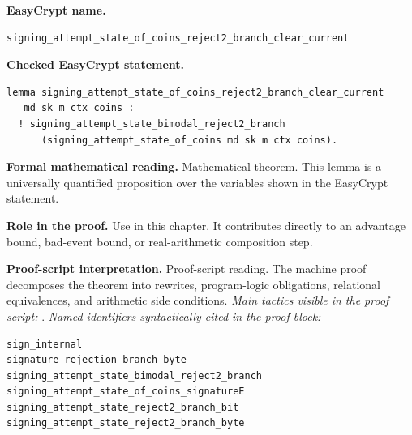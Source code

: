 \begin{formaltheorem}
\noindent\textbf{EasyCrypt name.}
\begin{lstlisting}[language=EasyCrypt,basicstyle=\ttfamily\scriptsize]
signing_attempt_state_of_coins_reject2_branch_clear_current
\end{lstlisting}
\noindent\textbf{Checked EasyCrypt statement.}
\begin{lstlisting}[language=EasyCrypt,basicstyle=\ttfamily\scriptsize]
lemma signing_attempt_state_of_coins_reject2_branch_clear_current
   md sk m ctx coins :
  ! signing_attempt_state_bimodal_reject2_branch
      (signing_attempt_state_of_coins md sk m ctx coins).
\end{lstlisting}
\noindent\textbf{Formal mathematical reading.}
Mathematical theorem. This lemma is a universally quantified proposition over the variables shown in the EasyCrypt statement.

\noindent\textbf{Role in the proof.}
Use in this chapter. It contributes directly to an advantage bound, bad-event bound, or real-arithmetic composition step.

\noindent\textbf{Proof-script interpretation.}
Proof-script reading. The machine proof decomposes the theorem into rewrites, program-logic obligations, relational equivalences, and arithmetic side conditions.
\emph{Main tactics visible in the proof script:} .
\emph{Named identifiers syntactically cited in the proof block:}
\begin{lstlisting}[language=EasyCrypt,basicstyle=\ttfamily\scriptsize]
sign_internal
signature_rejection_branch_byte
signing_attempt_state_bimodal_reject2_branch
signing_attempt_state_of_coins_signatureE
signing_attempt_state_reject2_branch_bit
signing_attempt_state_reject2_branch_byte
\end{lstlisting}

\end{formaltheorem}

